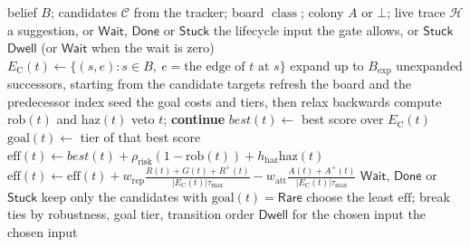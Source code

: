 \documentclass[11pt,a4paper]{article}
\newcommand{\cls}{\operatorname{class}}
\newcommand{\TS}{\mathcal{H}}
\newcommand{\Tau}{\tau_{\max}}
\begin{document}
\begin{algorithm}[H]
\footnotesize
\caption{Selecting the next event from the tracker's belief}
\label{alg:event}
\begin{algorithmic}[1]
\Require belief $B$; candidates $\mathcal{C}$ from the tracker; board
         $\cls$; colony $A$ or $\bot$; live trace $\TS$
\Ensure a suggestion, or $\mathsf{Wait}$, $\mathsf{Done}$ or
        $\mathsf{Stuck}$
  \State \Return the lifecycle input the gate allows, or $\mathsf{Stuck}$
\EndIf
{}
  \State \Return $\mathsf{Dwell}$ (or $\mathsf{Wait}$ when the wait is zero)
\EndIf
{}
  \State $E_{\mathrm{C}}(t)\gets
         \{(s,e):s\in B,\ e=\text{the edge of }t\text{ at }s\}$
\EndFor
\State expand up to $B_{\mathrm{exp}}$ unexpanded successors, starting from the
       candidate targets
\State refresh the board and the predecessor index
\State seed the goal costs and tiers, then relax backwards
  \State compute $\mathrm{rob}(t)$ and $\mathrm{haz}(t)$
    \State veto $t$; \textbf{continue}
  \EndIf
  \State $\mathit{best}(t)\gets$ best score over $E_{\mathrm{C}}(t)$
  \State $\mathrm{goal}(t)\gets$ tier of that best score
  \State $\mathrm{eff}(t)\gets\mathit{best}(t)
         +\rho_{\mathrm{risk}}(1-\mathrm{rob}(t))
         +h_{\mathrm{haz}}\mathrm{haz}(t)$
  \If{$A\ne\bot$ and $\Tau>0$}
    \State $\mathrm{eff}(t)\gets\mathrm{eff}(t)
           +w_{\mathrm{rep}}\frac{R(t)+G(t)+R^+(t)}
             {|E_{\mathrm{C}}(t)|\Tau}
           -w_{\mathrm{att}}\frac{A(t)+A^+(t)}
             {|E_{\mathrm{C}}(t)|\Tau}$
  \EndIf
\EndFor
{}
  \State \Return $\mathsf{Wait}$, $\mathsf{Done}$ or $\mathsf{Stuck}$
\EndIf
{}
  \State keep only the candidates with $\mathrm{goal}(t)=\mathsf{Rare}$
\EndIf
\State choose the least $\mathrm{eff}$; break ties by robustness, goal tier,
       transition order
  \State \Return $\mathsf{Dwell}$ for the chosen input
\EndIf
\State \Return the chosen input
\end{algorithmic}
\end{algorithm}
\end{document}
